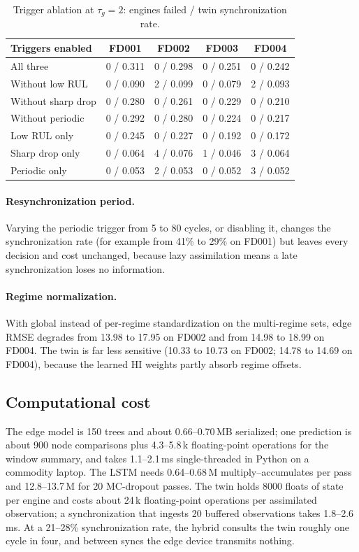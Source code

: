 \documentclass[preprint,12pt,authoryear]{elsarticle}
\newcommand{\botrule}{\bottomrule}
\begin{document}
\begin{table}[t]
\caption{Trigger ablation at $\tau_g = 2$: engines failed / twin synchronization rate.}\label{tab:triggers}
\begin{tabular*}{\textwidth}{@{\extracolsep\fill}lcccc}
\toprule
Triggers enabled & FD001 & FD002 & FD003 & FD004 \\
\midrule
All three             & 0 / 0.311 & 0 / 0.298 & 0 / 0.251 & 0 / 0.242 \\
Without low RUL       & 0 / 0.090 & 2 / 0.099 & 0 / 0.079 & 2 / 0.093 \\
Without sharp drop    & 0 / 0.280 & 0 / 0.261 & 0 / 0.229 & 0 / 0.210 \\
Without periodic      & 0 / 0.292 & 0 / 0.280 & 0 / 0.224 & 0 / 0.217 \\
Low RUL only          & 0 / 0.245 & 0 / 0.227 & 0 / 0.192 & 0 / 0.172 \\
Sharp drop only       & 0 / 0.064 & 4 / 0.076 & 1 / 0.046 & 3 / 0.064 \\
Periodic only         & 0 / 0.053 & 2 / 0.053 & 0 / 0.052 & 3 / 0.052 \\
\botrule
\end{tabular*}
\end{table}

\paragraph{Resynchronization period.} Varying the periodic trigger from 5 to 80 cycles, or disabling it, changes the synchronization rate (for example from 41\% to 29\% on FD001) but leaves every decision and cost unchanged, because lazy assimilation means a late synchronization loses no information.

\paragraph{Regime normalization.} With global instead of per-regime standardization on the multi-regime sets, edge RMSE degrades from 13.98 to 17.95 on FD002 and from 14.98 to 18.99 on FD004. The twin is far less sensitive (10.33 to 10.73 on FD002; 14.78 to 14.69 on FD004), because the learned HI weights partly absorb regime offsets.

\subsection{Computational cost}
The edge model is 150 trees and about 0.66--0.70\,MB serialized; one prediction is about 900 node comparisons plus 4.3--5.8\,k floating-point operations for the window summary, and takes 1.1--2.1\,ms single-threaded in Python on a commodity laptop. The LSTM needs 0.64--0.68\,M multiply--accumulates per pass and 12.8--13.7\,M for 20 MC-dropout passes. The twin holds 8000 floats of state per engine and costs about 24\,k floating-point operations per assimilated observation; a synchronization that ingests 20 buffered observations takes 1.8--2.6\,ms. At a 21--28\% synchronization rate, the hybrid consults the twin roughly one cycle in four, and between syncs the edge device transmits nothing.
\end{document}
